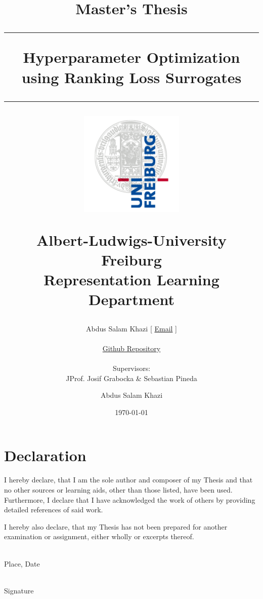\documentclass[12pt, twoside, ngerman]{report}
\author{
        Abdus Salam Khazi [
        \href{mailto:abdus.khazi@students.uni-freiburg.de}
                {Email} ]\\ \\
        \href{https://github.com/abduskhazi/ranking-loss-surrogates.git}
                {Github Repository} \cite{github_repository} \\ \\
        Supervisors:
        \begin{tabular}{ll}
             JProf. Josif Grabocka \&
			Sebastian Pineda
		\end{tabular}
       }
\begin{document}

\title{
{\LARGE Master's Thesis}
\vspace{20pt}
\hrule
\vspace{20pt}
\textbf{Hyperparameter Optimization using Ranking Loss Surrogates}
\vspace{20pt}
\hrule
\vspace{20pt}
\author{{\LARGE Abdus Salam Khazi}}
\date{\LARGE \today}
\begin{figure}[h]
    \centering
    \includegraphics[width=50mm]{images/Logo.png}
\end{figure}
\large{Albert-Ludwigs-University Freiburg
\\Representation Learning Department}
}
    

\maketitle
    


\chapter*{Declaration \thispagestyle{empty}}

I hereby declare, that I am the sole author and composer of my Thesis and that no
other sources or learning aids, other than those listed, have been used. Furthermore,
I declare that I have acknowledged the work of others by providing detailed
references of said work.

I hereby also declare, that my Thesis has not been prepared for another examination
or assignment, either wholly or excerpts thereof.

\vspace{100pt}

\begin{minipage}{2in}
\textbf{\underline{\hspace{100pt}}} \\
Place, Date
\end{minipage}
\hfill
\begin{minipage}{1.3in}
\textbf{\underline{\hspace{100pt}}} \\
Signature
\end{minipage}
\end{document}

